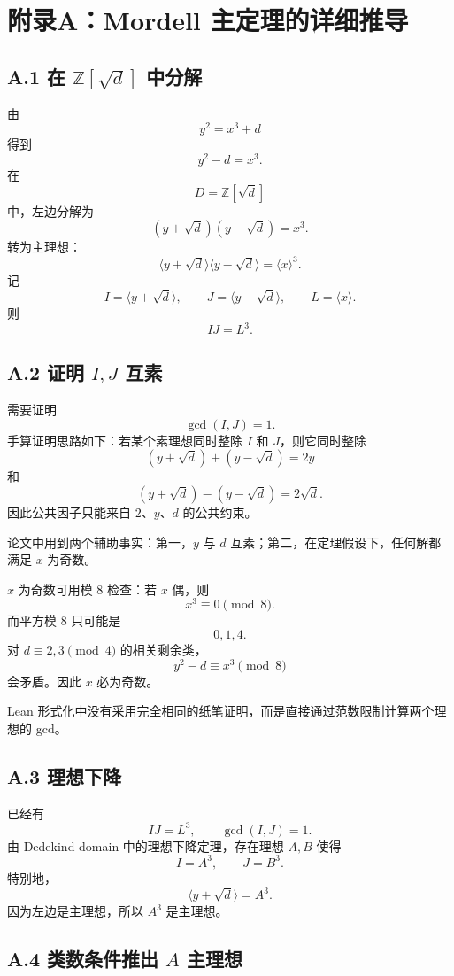 \newpage
{}
\section*{附录A：Mordell 主定理的详细推导}

\subsection*{A.1 在 \(\mathbb{Z}[\sqrt d]\) 中分解}

由
\[
y^2=x^3+d
\]
得到
\[
y^2-d=x^3.
\]
在
\[
D=\mathbb{Z}[\sqrt d]
\]
中，左边分解为
\[
(y+\sqrt d)(y-\sqrt d)=x^3.
\]
转为主理想：
\[
\langle y+\sqrt d\rangle\langle y-\sqrt d\rangle=\langle x\rangle^3.
\]
记
\[
I=\langle y+\sqrt d\rangle,\qquad
J=\langle y-\sqrt d\rangle,\qquad
L=\langle x\rangle.
\]
则
\[
IJ=L^3.
\]

\subsection*{A.2 证明 \(I,J\) 互素}

需要证明
\[
\gcd(I,J)=1.
\]
手算证明思路如下：若某个素理想同时整除 \(I\) 和 \(J\)，则它同时整除
\[
(y+\sqrt d)+(y-\sqrt d)=2y
\]
和
\[
(y+\sqrt d)-(y-\sqrt d)=2\sqrt d.
\]
因此公共因子只能来自 \(2\)、\(y\)、\(d\) 的公共约束。

论文中用到两个辅助事实：第一，\(y\) 与 \(d\) 互素；第二，在定理假设下，任何解都满足 \(x\) 为奇数。

\(x\) 为奇数可用模 \(8\) 检查：若 \(x\) 偶，则
\[
x^3\equiv 0\pmod 8.
\]
而平方模 \(8\) 只可能是
\[
0,1,4.
\]
对 \(d\equiv 2,3\pmod 4\) 的相关剩余类，
\[
y^2-d\equiv x^3\pmod 8
\]
会矛盾。因此 \(x\) 必为奇数。

Lean 形式化中没有采用完全相同的纸笔证明，而是直接通过范数限制计算两个理想的 gcd。

\subsection*{A.3 理想下降}

已经有
\[
IJ=L^3,\qquad \gcd(I,J)=1.
\]
由 Dedekind domain 中的理想下降定理，存在理想 \(A,B\) 使得
\[
I=A^3,\qquad J=B^3.
\]
特别地，
\[
\langle y+\sqrt d\rangle=A^3.
\]
因为左边是主理想，所以 \(A^3\) 是主理想。

\subsection*{A.4 类数条件推出 \(A\) 主理想}

